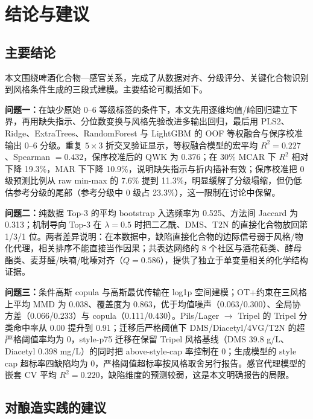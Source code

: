 
\section{结论与建议}
\label{sec:conclusion}

\subsection{主要结论}

本文围绕啤酒化合物—感官关系，完成了从数据对齐、分级评分、关键化合物识别到风格条件生成的三段式建模。主要结论可概括如下。

\textbf{问题一：}在缺少原始 0--6 等级标签的条件下，本文先用逐维均值/岭回归建立下界，再用缺失指示、分位数变换与风格先验改进多输出回归，最后用 PLS2、Ridge、ExtraTrees、RandomForest 与 LightGBM 的 OOF 等权融合与保序校准输出 0--6 分级。重复 $5\times3$ 折交叉验证显示，等权融合模型的宏平均 $R^2=0.227$、Spearman $=0.432$，保序校准后的 QWK 为 0.376；在 30\% MCAR 下 $R^2$ 相对下降 19.3\%，MAR 下下降 10.9\%，说明缺失指示与折内插补有效；保序校准把 0 级预测比例从 raw min-max 的 7.6\% 提到 11.3\%，明显缓解了分级塌缩，但仍低估参考分级的尾部（参考分级中 0 级占 23.3\%），这一限制在讨论中保留。

\textbf{问题二：}纯数据 Top-3 的平均 bootstrap 入选频率为 0.525、方法间 Jaccard 为 0.313；机制导向 Top-3 在 $\lambda=0.5$ 时把二乙酰、DMS、T2N 的直接化合物放回第 1/3/1 位。两者差异说明：在本数据中，缺陷直接化合物的边际信号弱于风格/物化代理，相关排序不能直接当作因果；共表达网络的 8 个社区与酒花萜类、酵母酯类、麦芽醛/呋喃/吡嗪对齐（$Q=0.586$），提供了独立于单变量相关的化学结构证据。

\textbf{问题三：}条件高斯 copula 与高斯最优传输在 log1p 空间建模；OT+约束在三风格上平均 MMD 为 0.038、覆盖度为 0.863，优于均值噪声（0.063/0.300）、全局协方差（0.066/0.233）与 copula（0.111/0.430）。Pils/Lager $\to$ Tripel 的 Tripel 分类命中率从 0.00 提升到 0.91；迁移后严格阈值下 DMS/Diacetyl/4VG/T2N 的超严格阈值率均为 0，style-p75 迁移在保留 Tripel 风格基线（DMS 39.8 \textmu g/L、Diacetyl 0.398 mg/L）的同时把 above-style-cap 率控制在 0；生成模型的 style cap 超标率四缺陷均为 0，严格阈值超标率按风格取舍另行报告。感官代理模型的嵌套 CV 平均 $R^2=0.220$，缺陷维度的预测较弱，这是本文明确报告的局限。

\subsection{对酿造实践的建议}


